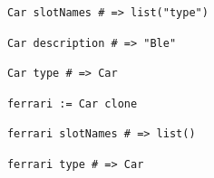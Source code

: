 \begin{frame}[fragile]
  \begin{center}
    \begin{lstlisting}
      Car slotNames # => list("type")
    \end{lstlisting}
  \end{center}
\end{frame}  

\begin{frame}[fragile]
  \begin{center}
    \begin{lstlisting}
      Car description # => "Ble"
    \end{lstlisting}
  \end{center}
\end{frame}  
  
\begin{frame}[fragile]
  \begin{center}
    \begin{lstlisting}
      Car type # => Car
    \end{lstlisting}
  \end{center}
\end{frame}  
  
\begin{frame}[fragile]
  \begin{center}
    \begin{lstlisting}
      ferrari := Car clone
    \end{lstlisting}
  \end{center}
\end{frame}

\begin{frame}[fragile]
  \begin{center}
    \begin{lstlisting}
      ferrari slotNames # => list()
    \end{lstlisting}
  \end{center}
\end{frame}  

\begin{frame}[fragile]
  \begin{center}
    \begin{lstlisting}
      ferrari type # => Car
    \end{lstlisting}
  \end{center}
\end{frame}

